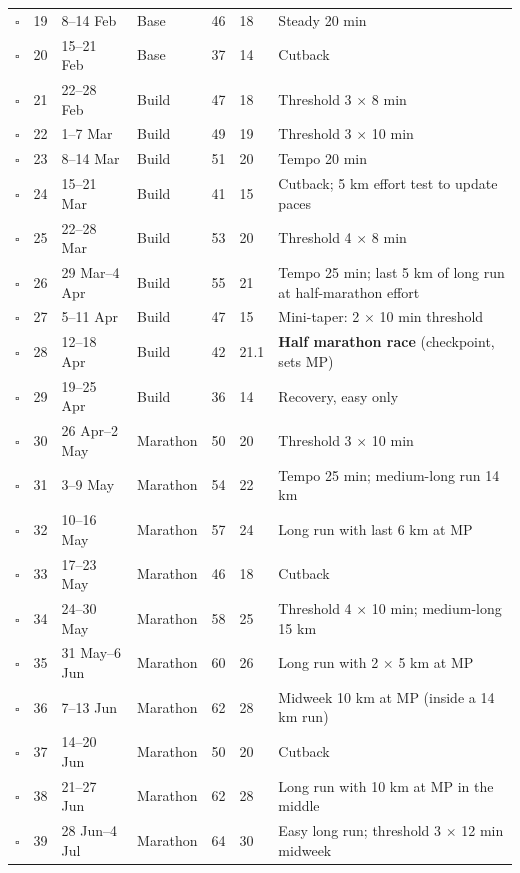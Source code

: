 \documentclass[11pt,a4paper]{article}
\begin{document}
{\begin{longtable}{@{}c r L{2.3cm} L{1.6cm} L{1.2cm} L{1.1cm} L{6.3cm}@{}}
$\square$ & 19 & 8--14 Feb & Base & 46 & 18 & Steady 20 min \\
$\square$ & 20 & 15--21 Feb & Base & 37 & 14 & Cutback \\
\midrule
$\square$ & 21 & 22--28 Feb & Build & 47 & 18 & Threshold 3 $\times$ 8 min \\
$\square$ & 22 & 1--7 Mar & Build & 49 & 19 & Threshold 3 $\times$ 10 min \\
$\square$ & 23 & 8--14 Mar & Build & 51 & 20 & Tempo 20 min \\
$\square$ & 24 & 15--21 Mar & Build & 41 & 15 & Cutback; 5 km effort test to update paces \\
$\square$ & 25 & 22--28 Mar & Build & 53 & 20 & Threshold 4 $\times$ 8 min \\
$\square$ & 26 & 29 Mar--4 Apr & Build & 55 & 21 & Tempo 25 min; last 5 km of long run at half-marathon effort \\
$\square$ & 27 & 5--11 Apr & Build & 47 & 15 & Mini-taper: 2 $\times$ 10 min threshold \\
$\square$ & 28 & 12--18 Apr & Build & 42 & 21.1 & \textbf{Half marathon race} (checkpoint, sets MP) \\
$\square$ & 29 & 19--25 Apr & Build & 36 & 14 & Recovery, easy only \\
\midrule
$\square$ & 30 & 26 Apr--2 May & Marathon & 50 & 20 & Threshold 3 $\times$ 10 min \\
$\square$ & 31 & 3--9 May & Marathon & 54 & 22 & Tempo 25 min; medium-long run 14 km \\
$\square$ & 32 & 10--16 May & Marathon & 57 & 24 & Long run with last 6 km at MP \\
$\square$ & 33 & 17--23 May & Marathon & 46 & 18 & Cutback \\
$\square$ & 34 & 24--30 May & Marathon & 58 & 25 & Threshold 4 $\times$ 10 min; medium-long 15 km \\
$\square$ & 35 & 31 May--6 Jun & Marathon & 60 & 26 & Long run with 2 $\times$ 5 km at MP \\
$\square$ & 36 & 7--13 Jun & Marathon & 62 & 28 & Midweek 10 km at MP (inside a 14 km run) \\
$\square$ & 37 & 14--20 Jun & Marathon & 50 & 20 & Cutback \\
$\square$ & 38 & 21--27 Jun & Marathon & 62 & 28 & Long run with 10 km at MP in the middle \\
$\square$ & 39 & 28 Jun--4 Jul & Marathon & 64 & 30 & Easy long run; threshold 3 $\times$ 12 min midweek \\

\end{longtable}}
\end{document}
